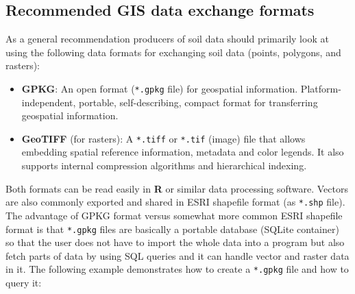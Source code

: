 \documentclass[10pt,b5paper,]{book}
\newenvironment{Shaded}{\begin{snugshade}}{\end{snugshade}}
\newcommand{\DataTypeTok}[1]{\textcolor[rgb]{0.13,0.29,0.53}{#1}}
\newcommand{\DecValTok}[1]{\textcolor[rgb]{0.00,0.00,0.81}{#1}}
\newcommand{\ErrorTok}[1]{\textcolor[rgb]{0.64,0.00,0.00}{\textbf{#1}}}
\newcommand{\KeywordTok}[1]{\textcolor[rgb]{0.13,0.29,0.53}{\textbf{#1}}}
\newcommand{\NormalTok}[1]{#1}
\newcommand{\OperatorTok}[1]{\textcolor[rgb]{0.81,0.36,0.00}{\textbf{#1}}}
\newcommand{\StringTok}[1]{\textcolor[rgb]{0.31,0.60,0.02}{#1}}
\providecommand{\tightlist}{%
  \setlength{\itemsep}{0pt}\setlength{\parskip}{0pt}}
\theoremstyle{definition}
\theoremstyle{definition}
\theoremstyle{definition}
\theoremstyle{remark}
\begin{document}
\hypertarget{recommended-gis-data-exchange-formats}{%
\subsection{Recommended GIS data exchange
formats}\label{recommended-gis-data-exchange-formats}}

As a general recommendation producers of soil data should primarily look
at using the following data formats for exchanging soil data (points,
polygons, and rasters):

\begin{itemize}
\tightlist
\item
  \textbf{GPKG}: An open format (\texttt{*.gpkg} file) for geospatial
  information. Platform-independent, portable, self-describing, compact
  format for transferring geospatial information.
\item
  \textbf{GeoTIFF} (for rasters): A \texttt{*.tiff} or \texttt{*.tif}
  (image) file that allows embedding spatial reference information,
  metadata and color legends. It also supports internal compression
  algorithms and hierarchical indexing.
\end{itemize}

Both formats can be read easily in \textbf{R} or similar data processing
software. Vectors are also commonly exported and shared in ESRI
shapefile format (as \texttt{*.shp} file). The advantage of GPKG format
versus somewhat more common ESRI shapefile format is that
\texttt{*.gpkg} files are basically a portable database (SQLite
container) so that the user does not have to import the whole data into
a program but also fetch parts of data by using SQL queries and it can
handle vector and raster data in it. The following example demonstrates
how to create a \texttt{*.gpkg} file and how to query it:

\begin{Shaded}
\end{Shaded}
\end{document}
